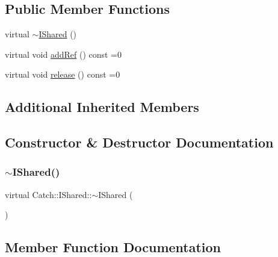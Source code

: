 \subsection*{Public Member Functions}
\begin{DoxyCompactItemize}
\item 
virtual \hyperlink{struct_catch_1_1_i_shared_a5e842e7540ae7ae0c62a2758123503f6}{$\sim$\+I\+Shared} ()
\item 
virtual void \hyperlink{struct_catch_1_1_i_shared_ae383df68557cdaf0910b411af04d9e33}{add\+Ref} () const =0
\item 
virtual void \hyperlink{struct_catch_1_1_i_shared_a002f52624728a763956fb6f230cb2f57}{release} () const =0
\end{DoxyCompactItemize}
\subsection*{Additional Inherited Members}


\subsection{Constructor \& Destructor Documentation}
\mbox{\label{struct_catch_1_1_i_shared_a5e842e7540ae7ae0c62a2758123503f6}} 
\subsubsection{\texorpdfstring{$\sim$\+I\+Shared()}{~IShared()}}
{\footnotesize\ttfamily virtual Catch\+::\+I\+Shared\+::$\sim$\+I\+Shared (\begin{DoxyParamCaption}{ }\end{DoxyParamCaption})\hspace{0.3cm}{\ttfamily [virtual]}}



\subsection{Member Function Documentation}
\mbox{\label{struct_catch_1_1_i_shared_ae383df68557cdaf0910b411af04d9e33}} 

